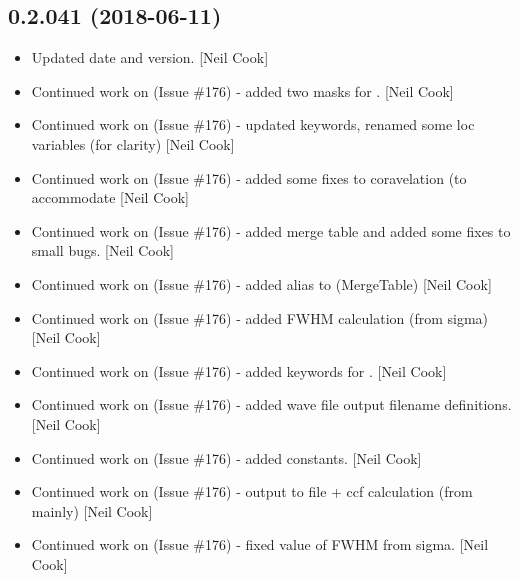 \documentclass[a4paper,10pt,english]{report}
\begin{document}
\subsection{0.2.041 (2018-06-11)}
\label{\detokenize{misc/changelog:id424}}\begin{itemize}
\item {} 
Updated date and version. {[}Neil Cook{]}

\item {} 
Continued work on  (Issue \#176) - added two masks for .
{[}Neil Cook{]}

\item {} 
Continued work on  (Issue \#176) - updated keywords, renamed some
loc variables (for clarity) {[}Neil Cook{]}

\item {} 
Continued work on  (Issue \#176) - added some fixes to
coravelation (to accommodate  {[}Neil Cook{]}

\item {} 
Continued work on  (Issue \#176) - added merge table and added
some fixes to small bugs. {[}Neil Cook{]}

\item {} 
Continued work on  (Issue \#176) - added alias to
 (MergeTable) {[}Neil Cook{]}

\item {} 
Continued work on  (Issue \#176) - added FWHM calculation (from
sigma) {[}Neil Cook{]}

\item {} 
Continued work on  (Issue \#176) - added keywords for .
{[}Neil Cook{]}

\item {} 
Continued work on  (Issue \#176) - added wave file output
filename definitions. {[}Neil Cook{]}

\item {} 
Continued work on  (Issue \#176) - added constants. {[}Neil Cook{]}

\item {} 
Continued work on  (Issue \#176) - output to file + ccf
calculation (from  mainly) {[}Neil Cook{]}

\item {} 
Continued work on  (Issue \#176) - fixed value of FWHM from
sigma. {[}Neil Cook{]}

\end{itemize}
\end{document}
